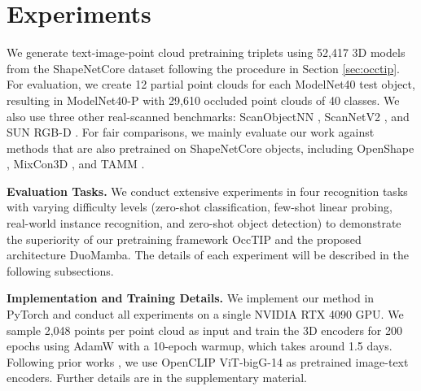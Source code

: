 \section{Experiments}
\label{sec:experiments}


We generate text-image-point cloud pretraining triplets using 52,417 3D models from the ShapeNetCore \cite{shapenet} dataset following the procedure in Section \ref{sec:occtip}. For evaluation, we create 12 partial point clouds for each ModelNet40 \cite{modelnet40} test object, resulting in ModelNet40-P with 29,610 occluded point clouds of 40 classes. We also use three other real-scanned benchmarks: ScanObjectNN \cite{scanobjectnn}, ScanNetV2 \cite{scannetv2}, and SUN RGB-D \cite{sunrgbd}. For fair comparisons, we mainly evaluate our work against methods that are also pretrained on ShapeNetCore \cite{shapenet} objects, including OpenShape \cite{openshape}, MixCon3D \cite{mixcon3d}, and TAMM \cite{tamm}. 

\vspace{1mm} \noindent\textbf{Evaluation Tasks.} We conduct extensive experiments in four recognition tasks with varying difficulty levels (zero-shot classification, few-shot linear probing, real-world instance recognition, and zero-shot object detection) to demonstrate the superiority of our pretraining framework OccTIP and the proposed architecture DuoMamba. The details of each experiment will be described in the following subsections.

\vspace{1mm}
\noindent\textbf{Implementation and Training Details.} We implement our method in PyTorch \cite{pytorch} and conduct all experiments on a single NVIDIA RTX 4090 GPU. We sample 2,048 points per point cloud as input and train the 3D encoders for 200 epochs using AdamW \cite{adamw} with a 10-epoch warmup, which takes around 1.5 days. Following prior works \cite{openshape,mixcon3d,tamm}, we use OpenCLIP ViT-bigG-14 \cite{openclip} as pretrained image-text encoders. Further details are in the supplementary material.

